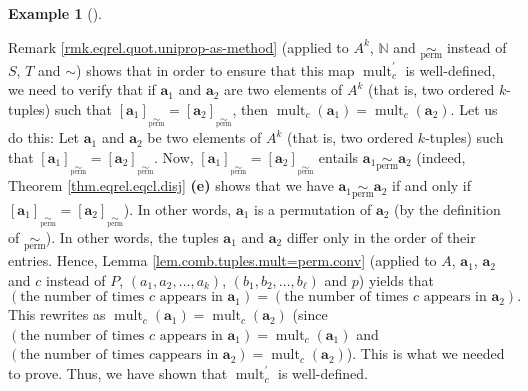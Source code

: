 \documentclass[numbers=enddot,12pt,final,onecolumn,notitlepage]{scrartcl}%
\numberwithin{exer}{subsection}
\theoremstyle{definition}
\newtheorem{exam}[theo]{Example}
\newenvironment{example}[1][]
{\begin{exam}[#1]\begin{leftbar}}
{\end{leftbar}\end{exam}}
\newenvironment{fineprint}{\begin{small}}{\end{small}}
\begin{document}
\begin{fineprint}
\begin{example}
Remark \ref{rmk.eqrel.quot.uniprop-as-method} (applied to $A^{k}$,
$\mathbb{N}$ and $\underset{\operatorname*{perm}}{\sim}$ instead of $S$, $T$
and $\sim$) shows that in order to ensure that this map $\operatorname*{mult}%
\nolimits_{c}^{\prime}$ is well-defined, we need to verify that if
$\mathbf{a}_{1}$ and $\mathbf{a}_{2}$ are two elements of $A^{k}$ (that is,
two ordered $k$-tuples) such that $\left[  \mathbf{a}_{1}\right]
_{\underset{\operatorname*{perm}}{\sim}}=\left[  \mathbf{a}_{2}\right]
_{\underset{\operatorname*{perm}}{\sim}}$, then $\operatorname*{mult}%
\nolimits_{c}\left(  \mathbf{a}_{1}\right)  =\operatorname*{mult}%
\nolimits_{c}\left(  \mathbf{a}_{2}\right)  $. Let us do this: Let
$\mathbf{a}_{1}$ and $\mathbf{a}_{2}$ be two elements of $A^{k}$ (that is, two
ordered $k$-tuples) such that $\left[  \mathbf{a}_{1}\right]
_{\underset{\operatorname*{perm}}{\sim}}=\left[  \mathbf{a}_{2}\right]
_{\underset{\operatorname*{perm}}{\sim}}$. Now, $\left[  \mathbf{a}%
_{1}\right]  _{\underset{\operatorname*{perm}}{\sim}}=\left[  \mathbf{a}%
_{2}\right]  _{\underset{\operatorname*{perm}}{\sim}}$ entails $\mathbf{a}%
_{1}\underset{\operatorname*{perm}}{\sim}\mathbf{a}_{2}$ (indeed, Theorem
\ref{thm.eqrel.eqcl.disj} \textbf{(e)} shows that we have $\mathbf{a}%
_{1}\underset{\operatorname*{perm}}{\sim}\mathbf{a}_{2}$ if and only if
$\left[  \mathbf{a}_{1}\right]  _{\underset{\operatorname*{perm}}{\sim}%
}=\left[  \mathbf{a}_{2}\right]  _{\underset{\operatorname*{perm}}{\sim}}$).
In other words, $\mathbf{a}_{1}$ is a permutation of $\mathbf{a}_{2}$ (by the
definition of $\underset{\operatorname*{perm}}{\sim}$). In other words, the
tuples $\mathbf{a}_{1}$ and $\mathbf{a}_{2}$ differ only in the order of their
entries. Hence, Lemma \ref{lem.comb.tuples.mult=perm.conv} (applied to $A$,
$\mathbf{a}_{1}$, $\mathbf{a}_{2}$ and $c$ instead of $P$, $\left(
a_{1},a_{2},\ldots,a_{k}\right)  $, $\left(  b_{1},b_{2},\ldots,b_{\ell
}\right)  $ and $p$) yields that%
\[
\left(  \text{the number of times }c\text{ appears in }\mathbf{a}_{1}\right)
=\left(  \text{the number of times }c\text{ appears in }\mathbf{a}_{2}\right)
.
\]
This rewrites as $\operatorname*{mult}\nolimits_{c}\left(  \mathbf{a}%
_{1}\right)  =\operatorname*{mult}\nolimits_{c}\left(  \mathbf{a}_{2}\right)
$ (since $\left(  \text{the number of times }c\text{ appears in }%
\mathbf{a}_{1}\right)  =\operatorname*{mult}\nolimits_{c}\left(
\mathbf{a}_{1}\right)  $ and $\left(  \text{the number of times }c\text{
appears in }\mathbf{a}_{2}\right)  =\operatorname*{mult}\nolimits_{c}\left(
\mathbf{a}_{2}\right)  $). This is what we needed to prove. Thus, we have
shown that $\operatorname*{mult}\nolimits_{c}^{\prime}$ is well-defined.


\end{example}
\end{fineprint}
\end{document}

